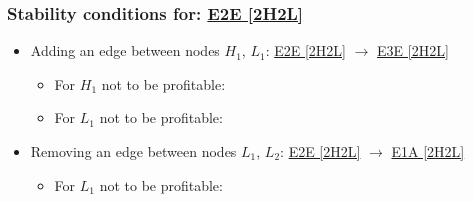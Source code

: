 

\subsubsection{Stability conditions for: \hyperref[apx:E2E:2H2L]{E2E [2H2L]}}
\label{apx:E2E:2H2L_stability_cond}

\begin{itemize}

	\item Adding an edge between nodes $H_1$, $L_1$: \hyperref[apx:E2E:2H2L]{E2E [2H2L]} $\to$ \hyperref[apx:E3E:2H2L]{E3E [2H2L]}

	\begin{itemize}

		\item For $H_1$ not to be profitable:


		\item For $L_1$ not to be profitable:


	\end{itemize}

	\item Removing an edge between nodes $L_1$, $L_2$: \hyperref[apx:E2E:2H2L]{E2E [2H2L]} $\to$ \hyperref[apx:E1A:2H2L]{E1A [2H2L]}

	\begin{itemize}

		\item For $L_1$ not to be profitable:


\end{itemize}
\end{itemize}
